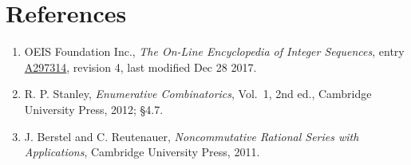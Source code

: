 \documentclass[11pt]{article}
\theoremstyle{definition}
\begin{document}
\section{References}

\begin{enumerate}

\item OEIS Foundation Inc., \emph{The On-Line Encyclopedia of Integer Sequences}, entry \href{https://oeis.org/A297314}{A297314}, revision 4, last modified Dec 28 2017.

\item R. P. Stanley, \emph{Enumerative Combinatorics}, Vol.~1, 2nd ed., Cambridge University Press, 2012; \S4.7.

\item J. Berstel and C. Reutenauer, \emph{Noncommutative Rational Series with Applications}, Cambridge University Press, 2011.

\end{enumerate}
\end{document}
